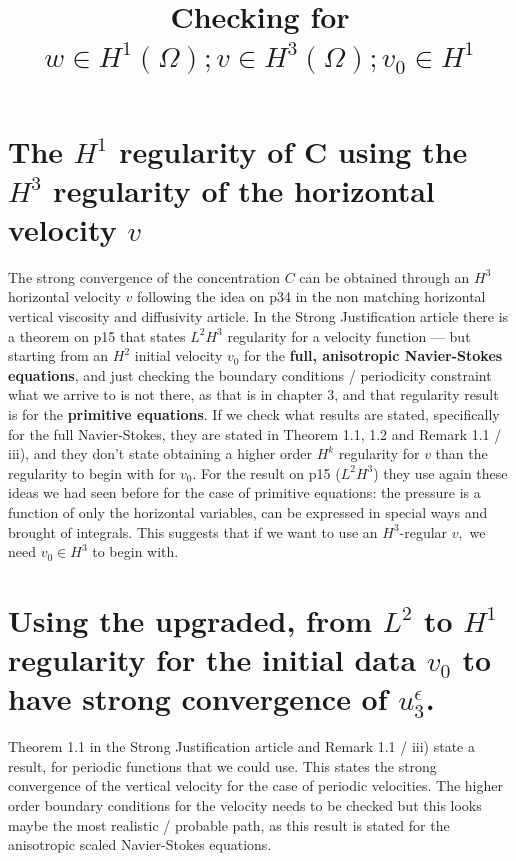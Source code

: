 \documentclass[11pt]{article}
\title{Checking for $w \in H^1 (\Omega); v \in H^3(\Omega); v_0 \in H^1$ }
\begin{document}
\date{}
\maketitle


\tableofcontents
\newpage

\section{The $H^1$ regularity of C using the $H^3$ regularity of the horizontal velocity $v$}

The strong convergence of the concentration $C$ can be obtained through an $H^3$ horizontal velocity $v$ following the idea on p34 in the non matching horizontal vertical viscosity and diffusivity article. In the Strong Justification article there is a theorem on p15 that states $L^2 H^3$ regularity for a velocity function --- but starting from an $H^2$ initial velocity $v_0$ for the \textbf{full, anisotropic Navier-Stokes equations}, and just checking the boundary conditions / periodicity constraint what we arrive to is not there, as that is in chapter 3, and that regularity result is for the \textbf{primitive equations}. If we check what results are stated, specifically for the full Navier-Stokes, they are stated in Theorem 1.1, 1.2 and Remark 1.1 / iii), and they don't state obtaining a higher order $H^k$ regularity for $v$ than the regularity to begin with for $v_0.$ For the result on p15 ($L^2 H^3$) they use again these ideas we had seen before for the case of primitive equations: the pressure is a function of only the horizontal variables, can be expressed in special ways and brought of integrals. This suggests that if we want to use an $H^3$-regular $v,$ we need $v_0 \in H^3$ to begin with.

\section{Using the upgraded, from $L^2$ to $H^1$ regularity for the initial data $v_0$ to have strong convergence of $u_3^\epsilon$.}

Theorem 1.1 in the Strong Justification article and Remark 1.1 / iii) state a result, for periodic functions that we could use. This states the strong convergence of the vertical velocity for the case of periodic velocities. The higher order boundary conditions for the velocity needs to be checked but this looks maybe the most realistic / probable path, as this result is stated for the anisotropic scaled Navier-Stokes equations.
\end{document}
